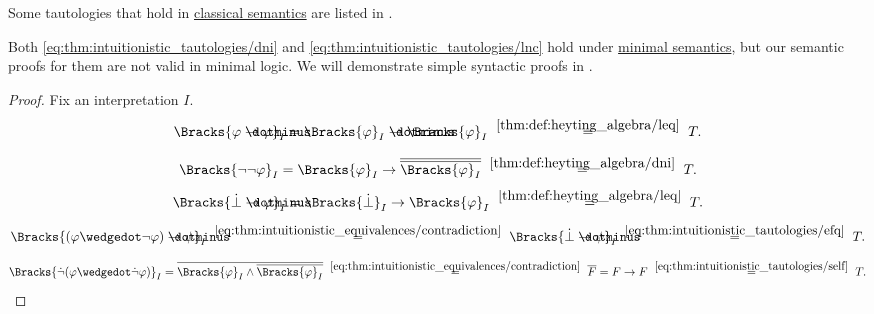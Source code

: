 \begin{comments}
  \item Some tautologies that hold in \hyperref[def:propositional_semantics/classical]{classical semantics} are listed in .
  \item Both \eqref{eq:thm:intuitionistic_tautologies/dni} and \eqref{eq:thm:intuitionistic_tautologies/lnc} hold under \hyperref[def:minimal_propositional_semantics]{minimal semantics}, but our semantic proofs for them are not valid in minimal logic. We will demonstrate simple syntactic proofs in .
\end{comments}
\begin{proof}
  Fix an interpretation \( I \).

  \begin{equation*}
    \Bracks{\varphi \synimplies \varphi}_I
    =
    \Bracks{\varphi}_I \synimplies \Bracks{\varphi}_I
    \reloset {\ref{thm:def:heyting_algebra/leq}} =
    T.
  \end{equation*}

  \begin{equation*}
    \Bracks{\neg \neg \varphi}_I
    =
    \Bracks{\varphi}_I \rightarrow \oline{\oline{\Bracks{\varphi}_I}}
    \reloset {\ref{thm:def:heyting_algebra/dni}} =
    T.
  \end{equation*}

  \begin{equation*}
    \Bracks{\synbot \synimplies \varphi}_I
    =
    \Bracks{\synbot}_I \rightarrow \Bracks{\varphi}_I
    \reloset {\ref{thm:def:heyting_algebra/leq}} =
    T.
  \end{equation*}

  \begin{equation*}
    \Bracks{(\varphi \synwedge \neg \varphi) \synimplies \psi}_I
    \reloset {\eqref{eq:thm:intuitionistic_equivalences/contradiction}} =
    \Bracks{\synbot \synimplies \psi}_I
    \reloset {\eqref{eq:thm:intuitionistic_tautologies/efq}} =
    T.
  \end{equation*}

  \begin{equation*}
    \Bracks{\synneg (\varphi \synwedge \synneg \varphi)}_I
    =
    \oline{\Bracks{\varphi}_I \wedge \oline{\Bracks{\varphi}_I}}
    \reloset {\eqref{eq:thm:intuitionistic_equivalences/contradiction}} =
    \oline{F}
    =
    F \rightarrow F
    \reloset {\eqref{eq:thm:intuitionistic_tautologies/self}} =
    T.
  \end{equation*}
\end{proof}

